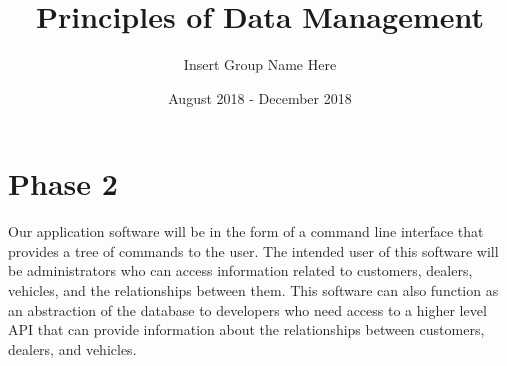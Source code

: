 \documentclass{math}
\title{Principles of Data Management}
\author{Insert Group Name Here}
\date{August 2018 - December 2018}
\begin{document}
\lstset{basicstyle=\ttfamily\footnotesize,breaklines=true}
\maketitle

\section*{Phase 2}
Our application software will be in the form of a command line interface that
provides a tree of commands to the user. The intended user of this software will
be administrators who can access information related to customers, dealers,
vehicles, and the relationships between them. This software can also function
as an abstraction of the database to developers who need access to a higher
level API that can provide information about the relationships between
customers, dealers, and vehicles.
\end{document}
